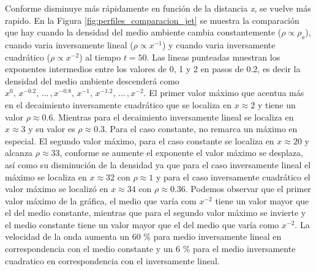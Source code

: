 \documentclass[12pt,a4paper]{book}
\begin{document}
Conforme disminuye más rápidamente en función de la distancia \emph{x}, 
se vuelve más rapido.
En la Figura \ref{fig:perfiles_comparacion_jet} se muestra la comparación que hay cuando la densidad del medio
ambiente cambia constantemente ($\rho \varpropto \rho_a$), cuando varia inversamente lineal ($\rho \varpropto x^{-1}$) y 
cuando varia inversamente cuadrático ($\rho \varpropto x^{-2}$) al tiempo $t = 50$. Las lineas
punteadas muestran los exponentes intermedios entre los valores de 0, 1 y 2 en pasos de 0.2, es decir la densidad
del medio ambiente descenderá como $x^0, \, x^{-0.2}, \, . . . \,  ,x^{-0.8} , \, x^{-1}  , \, x^{-1.2}
, \, . . . \,  , x^{-2}$.
El primer valor máximo que acentua más en el decaimiento inversamente cuadrático que se localiza en $x \approx 2$ y tiene
un valor $\rho \approx 0.6$. Mientras para el decaimiento inversamente lineal se localiza en $x \approx 3$ y su valor es 
$\rho  \approx  0.3$. Para el caso constante, no remarca un máximo en especial. El segundo valor máximo, 
para el caso 
constante se localiza en $x \approx 20$ y alcanza $\rho  \approx 33$, conforme se aumente el exponente el valor 
máximo se desplaza, así como su disminución de la densidad ya que para el caso inversamente lineal el máximo se localiza 
en $x \approx 32$ con $\rho \approx 1$ y para el caso inversamente cuadrático el valor máximo se localizó en 
$x \approx 34$ con $\rho \approx 0.36 $.  Podemos observar que el primer valor máximo de la gráfica, el medio
que varía com $x^{-2}$ tiene un valor mayor que el del medio constante, mientras que para el segundo valor máximo se invierte
y el medio constante tiene un valor mayor que el del medio que varía como $x^{-2}$.
La velocidad de la onda aumenta un 60 \% para medio inversamente lineal en correspondencia con el medio constante y un 6 \%
para el medio inversamente cuadratico en correspondencia con el inversamente lineal.  
\end{document}
